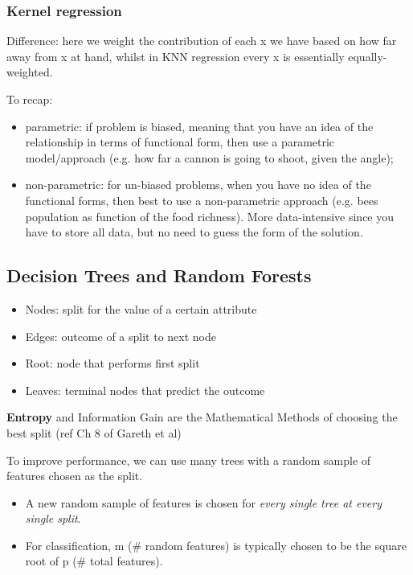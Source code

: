 \documentclass[12pt]{article}
\begin{document}
\subsubsection{Kernel regression}
Difference: here we weight the contribution of each x we have based on how far away from x at hand, whilst in KNN regression every x is essentially equally-weighted.

To recap:
\begin{itemize}
	\item parametric: if problem is biased, meaning that you have an idea of the relationship in terms of functional form, then use a parametric model/approach (e.g. how far a cannon is going to shoot, given the angle);
	\item non-parametric: for un-biased problems, when you have no idea of the functional forms, then best to use a non-parametric approach (e.g. bees population as function of the food richness). More data-intensive since you have to store all data, but no need to guess the form of the solution.
\end{itemize}

\subsection{Decision Trees and Random Forests}
\begin{itemize}
	\item Nodes: split for the value of a certain attribute
	\item Edges: outcome of a split to next node
\end{itemize}

\begin{itemize}
	\item Root: node that performs first split
	\item Leaves: terminal nodes that predict the outcome
\end{itemize}

\textbf{Entropy} and Information Gain are the Mathematical Methods of choosing the best split (ref Ch 8 of Gareth et al)

To improve performance, we can use many trees with a random sample of features chosen as the split.
\begin{itemize}
	\item  A new random sample of features is chosen for \textit{every single tree at every single split}.
	\item For classification, m (\# random features) is typically chosen to be the square root of p (\# total features).
\end{itemize}
\end{document}
